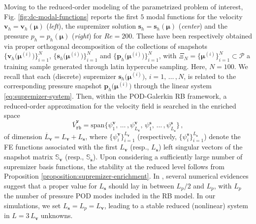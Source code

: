 \documentclass[12pt, a4paper, twoside, openright, notitlepage]{report}
\numberwithin{equation}{chapter}
\theoremstyle{theorem}
\theoremstyle{definition}
\theoremstyle{remark}
\theoremstyle{proposition}
\numberwithin{figure}{chapter}
\newcommand{\bg}[1]{\boldsymbol{#1}}
\begin{document}
		Moving to the reduced-order modeling of the parametrized problem of interest, Fig. \ref{fig:dc-modal-functions} reports the first $5$ modal functions for the velocity $\bg{v}_h = \bg{v}_h(\bg{\mu})$ (\emph{left}), the supremizer solution $\bg{s}_h = \bg{s}_h(\bg{\mu})$ (\emph{center}) and the pressure $p_h = p_h(\bg{\mu})$ (\emph{right}) for $Re = 200$. These have been respectively obtained via proper orthogonal decomposition of the collections of snapshots $\big\lbrace \mathbf{v}_h \big( \bg{\mu}^{(i)} \big) \big\rbrace_{i = 1}^N$, $\big\lbrace \mathbf{s}_h \big( \bg{\mu}^{(i)} \big) \big\rbrace_{i = 1}^N$ and $\big\lbrace \mathbf{p}_h \big( \bg{\mu}^{(i)} \big) \big\rbrace_{i = 1}^N$, with $\Xi_N = \big\lbrace \bg{\mu}^{(i)} \big\rbrace_{i = 1}^N \subset \mathcal{P}$ a training sample generated through latin hypercube sampling. Here, $N = 100$. We recall that each (discrete) supremizer $\mathbf{s}_h \big( \bg{\mu}^{(i)} \big)$, $i = 1, \, \ldots \, , N$, is related to the corresponding pressure snapshot $\mathbf{p}_h \big( \bg{\mu}^{(i)} \big)$ through the linear system \eqref{eq:supremizer-system}. Then, within the POD-Galerkin RB framework, a reduced-order approximation for the velocity field is searched in the enriched space 
		\begin{equation*}
			\overline{V}_{\texttt{rb}}^{\bg{v}} = \text{span} \big\lbrace \psi_1^{\bg{v}}, \, \ldots \, , \psi_{L_{\bg{v}}}^{\bg{v}}, \, \psi_1^{\bg{s}}, \, \ldots \, , \psi_{L_{\bg{s}}}^{\bg{s}} \big\rbrace \, ,
		\end{equation*}
		of dimension $\overline{L}_{\bg{v}} = L_{\bg{v}} + L_{\bg{s}}$, where $\big\lbrace \psi_i^{\bg{v}} \big\rbrace_{i = 1}^{L_{\bg{v}}}$ (respectively, $\big\lbrace \psi_i^{\bg{s}} \big\rbrace_{i = 1}^{L_{\bg{s}}}$) denote the FE functions associated with the first $L_{\bg{v}}$ (resp., $L_{\bg{s}}$) left singular vectors of the snapshot matrix $\mathbb{S}_{\bg{v}}$ (resp., $\mathbb{S}_{\bg{s}}$). Upon considering a sufficiently large number of supremizer basis functions, the stability at the reduced level follows from Proposition \ref{proposition:supremizer-enrichment}. In \cite{Bal14}, several numerical evidences suggest that a proper value for $L_{\bg{s}}$ should lay in between $L_p / 2$ and $L_p$, with $L_p$ the number of pressure POD modes included in the RB model. In our simulations, we set $L_{\bg{s}} = L_p = L_{\bg{v}}$, leading to a stable reduced (nonlinear) system in $L = 3 \, L_{\bg{v}}$ unknowns.
		
\end{document}

